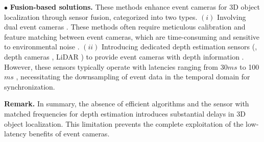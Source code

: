


\noindent $\bullet$ \textbf{Fusion-based solutions.}
These methods enhance event cameras for 3D object localization through sensor fusion, categorized into two types.
$(i)$ Involving dual event cameras \cite{zhou2021event, xu2023taming}. 
These methods often require meticulous calibration and feature matching between event cameras, which are time-consuming and sensitive to environmental noise \cite{falanga2020dynamic}.
$(ii)$ Introducing dedicated depth estimation sensors (\eg, depth cameras \cite{he2021fast}, LiDAR \cite{cui2022dense}) to provide event cameras with depth information \cite{li2022motion}. 
However, these sensors typically operate with latencies ranging from 30$ms$ to 100$ms$ \cite{li2023leovr}, necessitating the downsampling of event data in the temporal domain for synchronization.

\noindent \textbf{Remark.}
In summary, the absence of efficient algorithms and the sensor with matched frequencies for depth estimation introduces substantial delays in 3D object localization. 
This limitation prevents the complete exploitation of the low-latency benefits of event cameras.

